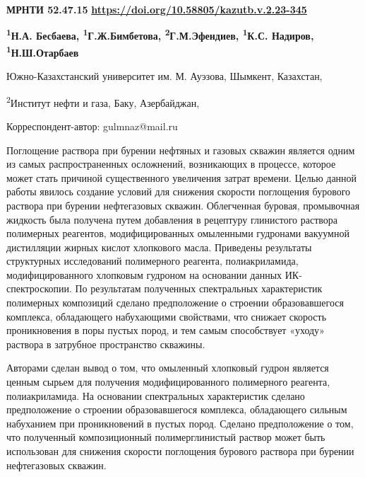\newpage
{}
{\bfseries МРНТИ 52.47.15}
\hfill {\bfseries \href{https://doi.org/10.58805/kazutb.v.2.23-345}{https://doi.org/10.58805/kazutb.v.2.23-345}}


\begin{center}
{\bfseries \textsuperscript{1}Н.А. Бесбаева, \textsuperscript{1}Г.Ж.Бимбетова\envelope, \textsuperscript{2}Г.М.Эфендиев, \textsuperscript{1}К.С. Надиров, \textsuperscript{1}Н.Ш.Отарбаев}

Южно-Казахстанский университет им. М. Ауэзова, Шымкент, Казахстан,

\textsuperscript{2}Институт нефти и газа, Баку, Азербайджан,

\envelope Корреспондент-автор: gulmnaz@mail.ru
\end{center}

Поглощение раствора при бурении нефтяных и газовых скважин является
одним из самых распространенных осложнений, возникающих в процессе,
которое может стать причиной существенного увеличения затрат времени.
Целью данной работы явилось создание условий для снижения скорости
поглощения бурового раствора при бурении нефтегазовых скважин.
Облегченная буровая, промывочная жидкость была получена путем добавления
в рецептуру глинистого раствора полимерных реагентов, модифицированных
омыленными гудронами вакуумной дистилляции жирных кислот хлопкового
масла. Приведены результаты структурных исследований полимерного
реагента, полиакриламида, модифицированного хлопковым гудроном на
основании данных ИК-спектроскопии. По результатам полученных
спектральных характеристик полимерных композиций сделано предположение о
строении образовавшегося комплекса, обладающего набухающими свойствами,
что снижает скорость проникновения в поры пустых пород, и тем самым
способствует «уходу» раствора в затрубное пространство скважины.

Авторами сделан вывод о том, что омыленный хлопковый гудрон является
ценным сырьем для получения модифицированного полимерного реагента,
полиакриламида. На основании спектральных характеристик сделано
предположение о строении образовавшегося комплекса, обладающего сильным
набуханием при проникновений в пустых пород. Сделано предположение о
том, что полученный композиционный полимерглинистый раствор может быть
использован для снижения скорости поглощения бурового раствора при
бурении нефтегазовых скважин.

